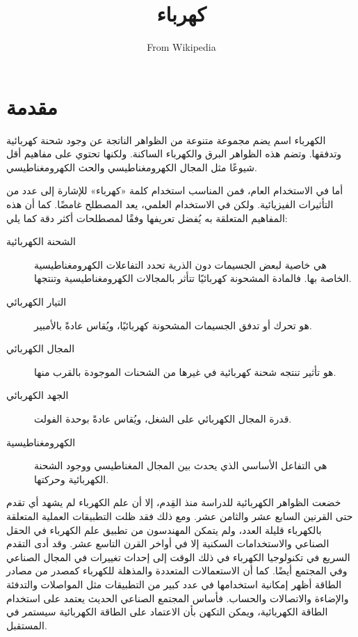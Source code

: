 \documentclass[a4paper]{book}
\title{كهرباء} \author{From Wikipedia}
\begin{document}
\frontmatter

\maketitle

\tableofcontents

\chapter{مقدمة}

الكهرباء اسم يضم مجموعة متنوعة من الظواهر الناتجة عن وجود شحنة
كهربائية وتدفقها. وتضم هذه الظواهر البرق والكهرباء الساكنة. ولكنها
تحتوي على مفاهيم أقل شيوعًا مثل المجال الكهرومغناطيسي والحث
الكهرومغناطيسي.

أما في الاستخدام العام، فمن المناسب استخدام كلمة «كهرباء» للإشارة إلى
عدد من التأثيرات الفيزيائية. ولكن في الاستخدام العلمي، يعد المصطلح
غامضًا. كما أن هذه المفاهيم المتعلقة به يُفضل تعريفها وفقًا لمصطلحات أكثر
دقة كما يلي:

\begin{description}
\item[الشحنة الكهربائية] هي خاصية لبعض الجسيمات دون الذرية تحدد
التفاعلات الكهرومغناطيسية الخاصة بها. فالمادة المشحونة كهربائيًا تتأثر
بالمجالات الكهرومغناطيسية وتنتجها.
\item[التيار الكهربائي] هو تحرك أو تدفق الجسيمات المشحونة كهربائيًا،
ويُقاس عادةً بالأمبير.
\item[المجال الكهربائي] هو تأثير تنتجه شحنة كهربائية في غيرها من
الشحنات الموجودة بالقرب منها.
\item[الجهد الكهربائي] قدرة المجال الكهربائي على الشغل، ويُقاس عادةً
بوحدة الفولت.
\item[الكهرومغناطيسية] هي التفاعل الأساسي الذي يحدث بين المجال
المغناطيسي ووجود الشحنة الكهربائية وحركتها.
\end{description}

خضعت الظواهر الكهربائية للدراسة منذ القِدم، إلا أن علم الكهرباء لم يشهد
أي تقدم حتى القرنين السابع عشر والثامن عشر. ومع ذلك فقد ظلت التطبيقات
العملية المتعلقة بالكهرباء قليلة العدد، ولم يتمكن المهندسون من تطبيق
علم الكهرباء في الحقل الصناعي والاستخدامات السكنية إلا في أواخر القرن
التاسع عشر. وقد أدى التقدم السريع في تكنولوجيا الكهرباء في ذلك الوقت
إلى إحداث تغييرات في المجال الصناعي وفي المجتمع أيضًا. كما أن
الاستعمالات المتعددة والمذهلة للكهرباء كمصدر من مصادر الطاقة أظهر
إمكانية استخدامها في عدد كبير من التطبيقات مثل المواصلات والتدفئة
والإضاءة والاتصالات والحساب. فأساس المجتمع الصناعي الحديث يعتمد على
استخدام الطاقة الكهربائية، ويمكن التكهن بأن الاعتماد على الطاقة
الكهربائية سيستمر في المستقبل.
\end{document}
